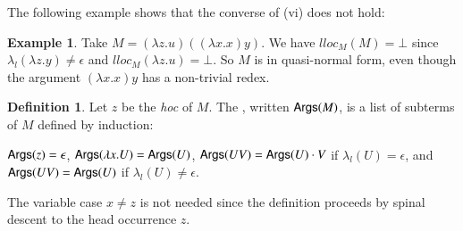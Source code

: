 \documentclass{elsarticle}
\newif\iflongversion
\theoremstyle{plain}
\newtheorem{property}[theorem]{Property}
\theoremstyle{definition}
\newtheorem{definition}{Definition}[section]
\newtheorem{example}{Example}[section]
\begin{document}
The following example shows that the converse of (vi) does not hold:
\begin{example}
Take $M= (\lambda z.u)((\lambda x . x) y)$. We have $lloc_M(M) = \bot$ since $\lambda_l(\lambda z.y)\ne\epsilon$ and $lloc_M(\lambda z.u) = \bot$.
So $M$ is in quasi-normal form, even though the argument $(\lambda x . x) y$ has a non-trivial redex.
\end{example}

\begin{definition}%
Let $z$ be the \emph{hoc} of $M$.
The , written ${\sf Args}(M)$, is a list of subterms of $M$ defined by induction:
\iflongversion
\begin{align*}
    & \begin{array}{ll}
        {\sf Args}(z) &= \epsilon \\
        {\sf Args}(\lambda x . U ) &= {\sf Args}(U)
    \end{array}
&
{\sf Args}(U V) &=
    \begin{cases}
        {\sf Args}(U) \cdot V & \mbox{if } \lambda_l(U) = \epsilon, \\
        {\sf Args}(U)         & \mbox{if } \lambda_l(U) \neq \epsilon.
    \end{cases}
\end{align*}
\else
${\sf Args}(z) = \epsilon$,
${\sf Args}(\lambda x . U ) = {\sf Args}(U)$,
${\sf Args}(U V) =
{\sf Args}(U) \cdot V$  if $\lambda_l(U) = \epsilon$,
 and ${\sf Args}(U V) = {\sf Args}(U)$
 if $\lambda_l(U) \neq \epsilon$.
\fi
The variable case $x\neq z$ is not needed since the definition proceeds by spinal descent to the head occurrence $z$.
\end{definition}

\iflongversion
\begin{property}
\label{property:hoc_argument_count_in_headnf}
    If $M$ is in quasi-head-normal form, then the head variable of its head-normal form has precisely $|{\sf Args}(M)|$ arguments.
\end{property}
\begin{proof}
By Theorem~\ref{thm:danosregnier_headlinred}, the \emph{hoc} of a quasi-head normal form becomes the head variable of the head-normal form after reducing the prime redexes, and it is easy to show by structural induction that standard beta-reduction preserves the number of pending hoc arguments.
\end{proof}
\fi
\end{document}
